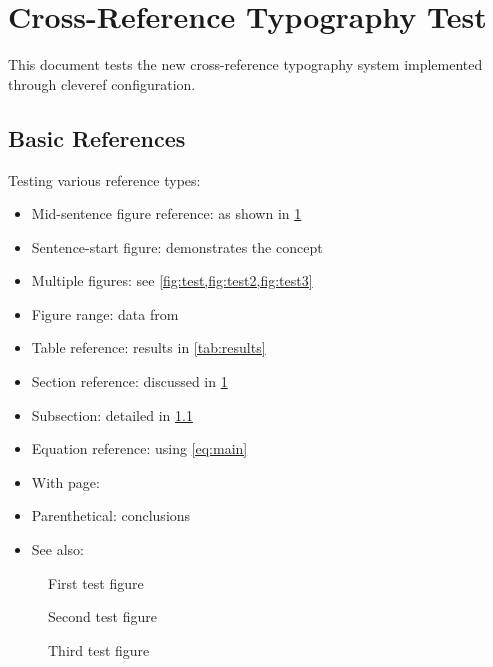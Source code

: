 \documentclass[11pt,letterpaper]{article}
\begin{document}
\section{Cross-Reference Typography Test}
\label{sec:intro}

This document tests the new cross-reference typography system implemented through cleveref configuration.

\subsection{Basic References}
\label{subsec:basic}

Testing various reference types:

\begin{itemize}
\item Mid-sentence figure reference: as shown in \cref{fig:test}
\item Sentence-start figure:  demonstrates the concept
\item Multiple figures: see \cref{fig:test,fig:test2,fig:test3}
\item Figure range: data from 
\item Table reference: results in \cref{tab:results}
\item Section reference: discussed in \cref{sec:intro}
\item Subsection: detailed in \cref{subsec:basic}
\item Equation reference: using \cref{eq:main}
\item With page: 
\item Parenthetical: conclusions 
\item See also: 
\end{itemize}

\begin{figure}[h]
  \centering
  \caption{First test figure}
  \label{fig:test}
\end{figure}

\begin{figure}[h]
  \centering
  \caption{Second test figure}
  \label{fig:test2}
\end{figure}

\begin{figure}[h]
  \centering
  \caption{Third test figure}
  \label{fig:test3}
\end{figure}
\end{document}
